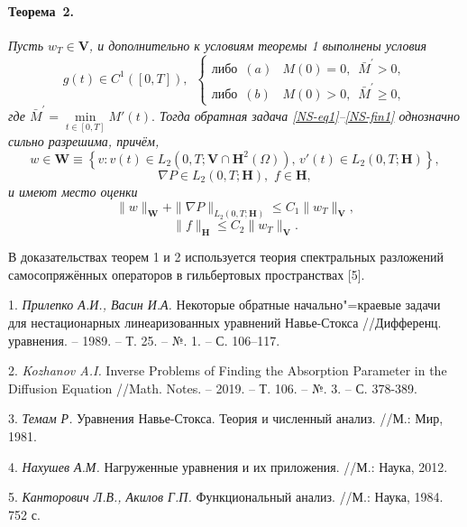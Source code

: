 \paragraph{Теорема~2.} {\it
Пусть $w_T\in\mathbf{V}$, и дополнительно к условиям теоремы 1 выполнены условия
\begin{equation}\label{NS-cond1}
g(t)\in C^1([0,T]),\,\,\,\left\{\begin{array}{ll}
                         \textrm{либо}\,\,\, (a)&M(0)=0,\,\,\, \bar{M}^{\prime}>0,\\
                         \textrm{либо}\,\,\, (b)&M(0)>0,\,\,\, \bar{M}^{\prime}\geq0,
                         \end{array}\right.
\end{equation}
где $\bar{M}^{\prime}=\min\limits_{t\in[0,T]}M'(t).$
Тогда обратная задача \eqref{NS-eq1}--\eqref{NS-fin1} однозначно сильно разрешима, причём,
$$
w\!\in\!\mathbf{W}\equiv \left\{v: v(t)\in L_2(0,T;\mathbf{V}\cap\mathbf{H}^2(\Omega)),\, v'(t)\in L_2(0,T;\mathbf{H})\right\}\!\!,
$$
$$
\nabla P\in L_2(0,T; \mathbf{H}),\,\, f\in \mathbf{H},
$$
и имеют место оценки
\begin{equation} \label{NS-est3}
\|w\|_{\mathbf{W}}+\|\nabla P\|_{L_2(0,T; \mathbf{H})}\leq C_1\|w_T\|_{\mathbf{V}},
\end{equation}
\begin{equation} \label{NS-est4}
\|f\|_{\mathbf{H}}\leq C_2\|w_T\|_{\mathbf{V}}.
\end{equation}
}

В доказательствах теорем 1 и 2 используется теория спектральных разложений самосопряжённых операторов в гильбертовых пространствах [5].

\litlist



1. {\it Прилепко А.И., Васин И.А.} Некоторые обратные начально"=краевые задачи для нестационарных линеаризованных уравнений Навье-Стокса //Дифференц. уравнения. – 1989. – Т. 25. – №. 1. – С. 106–117.

2. {\it Kozhanov A.I.} Inverse Problems of Finding the Absorption Parameter in the Diffusion Equation //Math. Notes. – 2019. – Т. 106. – №. 3. – С. 378-389.

3. {\it Темам Р.} Уравнения Навье-Стокса. Теория и численный анализ. //М.: Мир, 1981.

4. {\it Нахушев А.М.}  Нагруженные уравнения и их приложения. //М.: Наука, 2012.

5. {\it Канторович Л.В., Акилов Г.П.} Функциональный анализ. //М.: Наука, 1984. 752 с.

